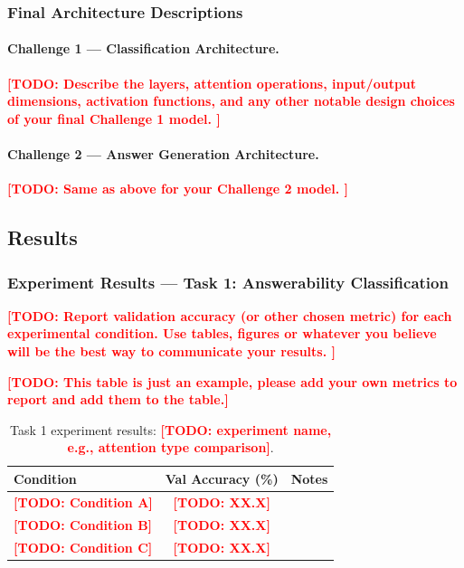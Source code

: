 \documentclass[11pt]{article}
\newcommand{\todo}[1]{\textcolor{red}{\textbf{[TODO: #1]}}}
\begin{document}
\subsubsection{Final Architecture Descriptions}

\paragraph{Challenge 1 — Classification Architecture.}
\todo{
  Describe the layers, attention operations, input/output dimensions,
  activation functions, and any other notable design choices of your
  final Challenge 1 model.
}

\paragraph{Challenge 2 — Answer Generation Architecture.}
\todo{
  Same as above for your Challenge 2 model.
}

\subsection{Results}

\subsubsection{Experiment Results — Task 1: Answerability Classification}

\todo{
  Report validation accuracy (or other chosen metric) for each experimental
  condition. Use tables, figures or whatever you believe will be the best way to communicate your results.
}

\todo{This table is just an example, please add your own metrics to report and add them to the table.}
\begin{table}[h]
  \centering
  \caption{Task 1 experiment results: \todo{experiment name, e.g., attention type comparison}.}
  \label{tab:exp1_cls}
  \begin{tabular}{lcc}
    \toprule
    \textbf{Condition} & \textbf{Val Accuracy (\%)} & \textbf{Notes} \\
    \midrule
    \todo{Condition A}  & \todo{XX.X}  & \\
    \todo{Condition B}  & \todo{XX.X}  & \\
    \todo{Condition C}  & \todo{XX.X}  & \\
    \bottomrule
  \end{tabular}
\end{table}
\end{document}

